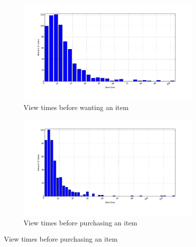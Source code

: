     \begin{figure}[H]
        \centering
        \begin{subfigure}{.5\textwidth}
            \centering
            \includegraphics[width=\dualGraphWidth]{image/product_wanteddistribution.png}
            \caption{View times before wanting an item}
    \label{figure:viewWant}
        \end{subfigure}%
        \begin{subfigure}{.5\textwidth}
            \centering
            \includegraphics[width=\dualGraphWidth]{image/product_purchase_intendeddistribution.png}
            \caption{View times before purchasing an item}
    \label{figure:viewBuy}
        \end{subfigure}
    \end{figure}

